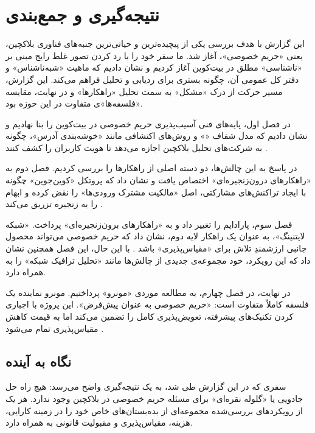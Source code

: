 \chapter*{نتیجه‌گیری و جمع‌بندی}
\label{chap:conclusion}

این گزارش با هدف بررسی یکی از پیچیده‌ترین و حیاتی‌ترین جنبه‌های فناوری بلاکچین، یعنی «حریم خصوصی»، آغاز شد. ما سفر خود را با رد کردن تصور غلط رایج مبنی بر «ناشناسی» مطلق در بیت‌کوین آغاز کردیم و نشان دادیم که ماهیت «شبه‌ناشناس» و دفتر کل عمومی آن، چگونه بستری برای ردیابی و تحلیل فراهم می‌کند. این گزارش، مسیر حرکت از درک «مشکل» به سمت تحلیل «راهکارها» و در نهایت، مقایسه «فلسفه‌ها»ی متفاوت در این حوزه بود.

در فصل اول، پایه‌های فنی آسیب‌پذیری حریم خصوصی در بیت‌کوین را بنا نهادیم و نشان دادیم که مدل شفاف «» و روش‌های اکتشافی مانند «خوشه‌بندی آدرس»، چگونه به شرکت‌های تحلیل بلاکچین اجازه می‌دهد تا هویت کاربران را کشف کنند \cite{narayanan_deanonymizing}.

در پاسخ به این چالش‌ها، دو دسته اصلی از راهکارها را بررسی کردیم. فصل دوم به «راهکارهای درون‌زنجیره‌ای» اختصاص یافت و نشان داد که پروتکل «کوین‌جوین» چگونه با ایجاد تراکنش‌های مشارکتی، اصل «مالکیت مشترک ورودی‌ها» را نقض کرده و ابهام را به زنجیره تزریق می‌کند \cite{maxwell_coinjoin}.

فصل سوم، پارادایم را تغییر داد و به «راهکارهای برون‌زنجیره‌ای» پرداخت. «شبکه لایتنینگ»، به عنوان یک راهکار لایه دوم، نشان داد که حریم خصوصی می‌تواند محصول جانبی ارزشمندِ تلاش برای «مقیاس‌پذیری» باشد \cite{decker_sok}. با این حال، این فصل همچنین نشان داد که این رویکرد، خود مجموعه‌ی جدیدی از چالش‌ها مانند «تحلیل ترافیک شبکه» را به همراه دارد.

در نهایت، در فصل چهارم، به مطالعه موردی «مونرو» پرداختیم. مونرو نماینده یک فلسفه کاملاً متفاوت است: «حریم خصوصی به عنوان پیش‌فرض». این پروژه با اجباری کردن تکنیک‌های پیشرفته، تعویض‌پذیری کامل را تضمین می‌کند اما به قیمت کاهش مقیاس‌پذیری تمام می‌شود \cite{monero_website}.

\section*{نگاه به آینده}

سفری که در این گزارش طی شد، به یک نتیجه‌گیری واضح می‌رسد: هیچ راه حل جادویی یا «گلوله نقره‌ای» برای مسئله حریم خصوصی در بلاکچین وجود ندارد. هر یک از رویکردهای بررسی‌شده مجموعه‌ای از بده‌بستان‌های خاص خود را در زمینه کارایی، هزینه، مقیاس‌پذیری و مقبولیت قانونی به همراه دارد.

